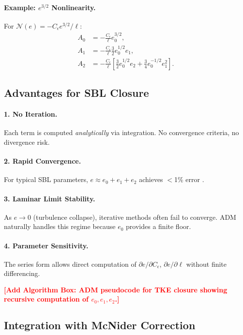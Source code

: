 \documentclass[twocolumn,11pt]{article}
\newcommand{\TODO}[1]{\textcolor{red}{\textbf{[#1]}}}
\begin{document}
\paragraph{Example: $e^{3/2}$ Nonlinearity.} For $\mathcal{N}(e) = -C_\epsilon e^{3/2}/\ell$:
\begin{align}
A_0 &= -\frac{C_\epsilon}{\ell}e_0^{3/2}, \\
A_1 &= -\frac{C_\epsilon}{\ell}\frac{3}{2}e_0^{1/2}e_1, \\
A_2 &= -\frac{C_\epsilon}{\ell}\left[\frac{3}{2}e_0^{1/2}e_2 + \frac{3}{4}e_0^{-1/2}e_1^2\right].
\end{align}

\subsection{Advantages for SBL Closure}

\paragraph{1. No Iteration.} Each term is computed \textit{analytically} via integration. No convergence criteria, no divergence risk.

\paragraph{2. Rapid Convergence.} For typical SBL parameters, $e \approx e_0 + e_1 + e_2$ achieves $<$1\% error \citep{biazar2003}.

\paragraph{3. Laminar Limit Stability.} As $e \to 0$ (turbulence collapse), iterative methods often fail to converge. ADM naturally handles this regime because $e_0$ provides a finite floor.

\paragraph{4. Parameter Sensitivity.} The series form allows direct computation of $\partial e / \partial C_\epsilon$, $\partial e / \partial \ell$ without finite differencing.

\TODO{Add Algorithm Box: ADM pseudocode for TKE closure showing recursive computation of $e_0, e_1, e_2$.}

\subsection{Integration with McNider Correction}
\end{document}
